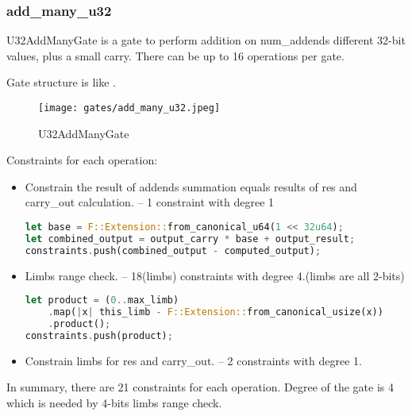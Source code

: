 \subsubsection{add\_many\_u32}

U32AddManyGate is a gate to perform addition on num\_addends different 32-bit values, plus a small carry. 
There can be up to 16 operations per gate.

Gate structure is like .

\begin{figure}[!ht]
    \centering
    \texttt{[image: gates/add\_many\_u32.jpeg]}
    \caption{U32AddManyGate}
    \label{fig:add-many-u32}
\end{figure}

Constraints for each operation:
\begin{itemize}
    \item Constrain the result of addends summation equals results of res and carry\_out calculation. -- 1 constraint with degree 1
    \begin{lstlisting}[language=rust]
let base = F::Extension::from_canonical_u64(1 << 32u64);
let combined_output = output_carry * base + output_result;
constraints.push(combined_output - computed_output);
    \end{lstlisting}
    \item Limbs range check. -- 18(limbs) constraints with degree 4.(limbs are all 2-bits)
    \begin{lstlisting}[language=rust]
let product = (0..max_limb)
    .map(|x| this_limb - F::Extension::from_canonical_usize(x))
    .product();
constraints.push(product);
    \end{lstlisting}
    \item Constrain limbs for res and carry\_out. -- 2 constraints with degree 1.
\end{itemize}

In summary, there are 21 constraints for each operation. Degree of the gate is 4 which is needed by 4-bits limbs range check.
